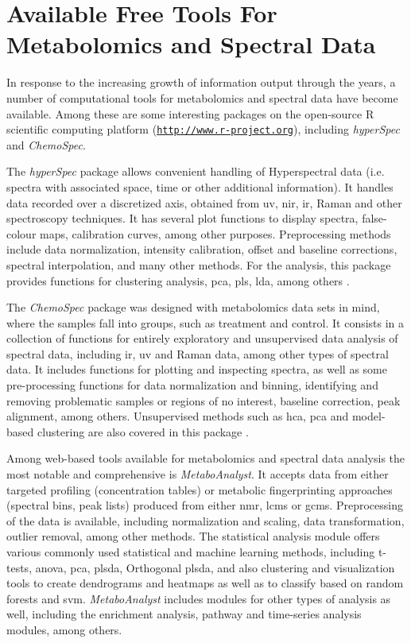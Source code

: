 
\section{Available Free Tools For Metabolomics and Spectral Data} \label{met_tools}

In response to the increasing growth of information output through the years, a number of computational tools for metabolomics and spectral data have become available. Among these are some interesting packages on the open-source R scientific computing platform (\href{http://www.r-project.org}{\nolinkurl{http://www.r-project.org}}), including \textit{hyperSpec} and \textit{ChemoSpec}. 

The \textit{hyperSpec} package allows convenient handling of Hyperspectral data (i.e. spectra with associated space, time or other additional information). It handles data recorded over a discretized axis, obtained from \gls{uv}, \gls{nir}, \gls{ir}, Raman and other spectroscopy techniques. It has several plot functions to display spectra, false-colour maps, calibration curves, among other purposes. Preprocessing methods include data normalization, intensity calibration, offset and baseline corrections, spectral interpolation, and many other methods. For the analysis, this package provides functions for clustering analysis, \gls{pca}, \gls{pls}, \gls{lda}, among others \citep{hyperspec}.

The \textit{ChemoSpec} package was designed with metabolomics data sets in mind, where the samples fall into groups, such as treatment and control. It consists in a collection of functions for entirely exploratory and unsupervised data analysis of spectral data, including \gls{ir}, \gls{uv} and Raman data, among other types of spectral data. It includes functions for plotting and inspecting spectra, as well as some pre-processing functions for data normalization and binning, identifying and removing problematic samples or regions of no interest, baseline correction, peak alignment, among others. Unsupervised methods such as \gls{hca}, \gls{pca} and model-based clustering are also covered in this package \citep{chemospec}.

Among web-based tools available for metabolomics and spectral data analysis the most notable and comprehensive is \textit{MetaboAnalyst}. It accepts data from either targeted profiling (concentration tables) or metabolic fingerprinting approaches (spectral bins, peak lists) produced from either \gls{nmr}, \gls{lcms} or \gls{gcms}. Preprocessing of the data is available, including normalization and scaling, data transformation, outlier removal, among other methods. The statistical analysis module offers various commonly used statistical and machine learning methods, including t-tests, \gls{anova}, \gls{pca}, \gls{plsda}, Orthogonal \gls{plsda}, and also clustering and visualization tools to create dendrograms and heatmaps as well as to classify based on random forests and \gls{svm}. \textit{MetaboAnalyst} includes modules for other types of analysis as well, including the enrichment analysis, pathway and time-series analysis modules, among others. 

